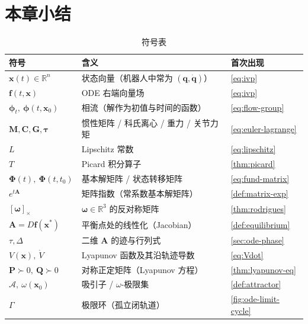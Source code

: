 \section*{本章小结}

\begin{table}[H]\centering\small
\caption{符号表}
\begin{tabular}{lll}
\toprule
符号 & 含义 & 首次出现 \\
\midrule
$\mathbf{x}(t)\in\mathbb{R}^n$ & 状态向量（机器人中常为 $(\mathbf{q},\dot{\mathbf{q}})$） & \cref{eq:ivp} \\
$\mathbf{f}(t,\mathbf{x})$ & ODE 右端向量场 & \cref{eq:ivp} \\
$\boldsymbol{\phi}_t,\ \boldsymbol{\phi}(t,\mathbf{x}_0)$ & 相流（解作为初值与时间的函数） & \cref{eq:flow-group} \\
$\mathbf{M},\mathbf{C},\mathbf{G},\boldsymbol{\tau}$ & 惯性矩阵 / 科氏离心 / 重力 / 关节力矩 & \cref{eq:euler-lagrange} \\
$L$ & Lipschitz 常数 & \cref{eq:lipschitz} \\
$T$ & Picard 积分算子 & \cref{thm:picard} \\
$\boldsymbol{\Phi}(t),\ \boldsymbol{\Phi}(t,t_0)$ & 基本解矩阵 / 状态转移矩阵 & \cref{eq:fund-matrix} \\
$e^{t\mathbf{A}}$ & 矩阵指数（常系数基本解矩阵） & \cref{def:matrix-exp} \\
$[\boldsymbol{\omega}]_\times$ & $\boldsymbol{\omega}\in\mathbb{R}^3$ 的反对称矩阵 & \cref{thm:rodrigues} \\
$\mathbf{A}=D\mathbf{f}(\mathbf{x}^*)$ & 平衡点处的线性化（Jacobian） & \cref{def:equilibrium} \\
$\tau,\Delta$ & 二维 $\mathbf{A}$ 的迹与行列式 & \cref{sec:ode-phase} \\
$V(\mathbf{x}),\ \dot V$ & Lyapunov 函数及其沿轨迹导数 & \cref{eq:Vdot} \\
$\mathbf{P}\succ0,\ \mathbf{Q}\succ0$ & 对称正定矩阵（Lyapunov 方程） & \cref{thm:lyapunov-eq} \\
$\mathcal{A},\ \omega(\mathbf{x}_0)$ & 吸引子 / $\omega$-极限集 & \cref{def:attractor} \\
$\Gamma$ & 极限环（孤立闭轨道） & \cref{fig:ode-limit-cycle} \\
\bottomrule
\end{tabular}
\end{table}

